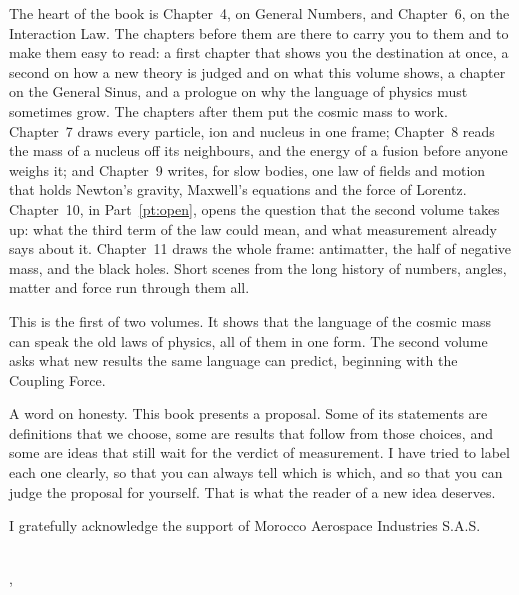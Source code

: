 The heart of the book is Chapter~4, on General Numbers, and Chapter~6, on the Interaction Law. The chapters before them are there to carry you to them and to make them easy to read: a first chapter that shows you the destination at once, a second on how a new theory is judged and on what this volume shows, a chapter on the General Sinus, and a prologue on why the language of physics must sometimes grow. The chapters after them put the cosmic mass to work. Chapter~7 draws every particle, ion and nucleus in one frame; Chapter~8 reads the mass of a nucleus off its neighbours, and the energy of a fusion before anyone weighs it; and Chapter~9 writes, for slow bodies, one law of fields and motion that holds Newton's gravity, Maxwell's equations and the force of Lorentz. Chapter~10, in Part~\ref{pt:open}, opens the question that the second volume takes up: what the third term of the law could mean, and what measurement already says about it. Chapter~11 draws the whole frame: antimatter, the half of negative mass, and the black holes. Short scenes from the long history of numbers, angles, matter and force run through them all.

This is the first of two volumes. It shows that the language of the cosmic mass can speak the old laws of physics, all of them in one form. The second volume asks what new results the same language can predict, beginning with the Coupling Force.

A word on honesty. This book presents a proposal. Some of its statements are definitions that we choose, some are results that follow from those choices, and some are ideas that still wait for the verdict of measurement. I have tried to label each one clearly, so that you can always tell which is which, and so that you can judge the proposal for yourself. That is what the reader of a new idea deserves.


\bigskip

\noindent{}

\medskip

\noindent I gratefully acknowledge the support of Morocco Aerospace Industries S.A.S. 

\bigskip

\begin{flushright}
\myName\\
,  \myTime
\end{flushright}
